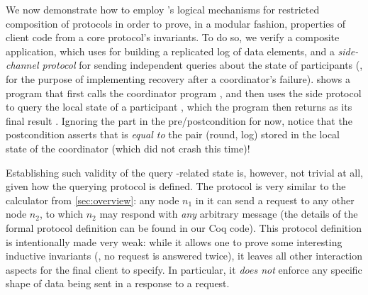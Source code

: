 We now demonstrate how to employ \disel's logical mechanisms for
restricted composition of protocols in order to prove, in a modular
fashion, properties of client code from a core protocol's invariants.
%
To do so, we verify a composite application, which uses  for
building a replicated log of data elements, and a \emph{side-channel
  protocol} for sending independent queries about the state of
 participants (\eg, for the purpose of implementing recovery
after a coordinator's failure).
%
 shows a program that first calls the
coordinator program , and then uses the side
protocol to query the local state of a participant , which
the program then returns as its final result .  Ignoring the
 part in the pre/postcondition for now, notice that
the postcondition asserts that  is \emph{equal to} the pair
 (round, log) stored in the local state of the coordinator
(which did not crash this time)!

Establishing such validity of the query \wrt {}-related state
is, however, not trivial at all, given how the querying protocol is
defined. The protocol  is very similar to the calculator
from \cref{sec:overview}: any node $n_1$ in it can send a
request to any other node $n_2$, to which $n_2$ may respond with
\emph{any} arbitrary message (the details of the formal protocol
definition can be found in our Coq code). This protocol definition is
intentionally made very weak: while it allows one to prove some
interesting inductive invariants (\eg, no request is answered twice),
it leaves all other interaction aspects for the final client to
specify. In particular, it \emph{does not} enforce any specific shape
of data being sent in a response to a request.

